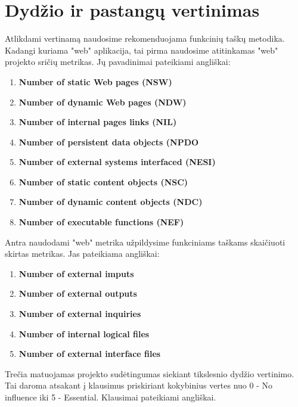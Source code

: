 \documentclass[a4paper,12pt]{article}
\begin{document}
\section{ Dydžio ir pastangų vertinimas}
Atlikdami vertinamą naudosime rekomenduojama funkcinių taškų metodika. Kadangi kuriama "web" aplikacija, tai pirma naudosime atitinkamas "web" projekto sričių metrikas. Jų pavadinimai pateikiami angliškai:
\begin{enumerate}
\item \textbf{Number of static Web pages (NSW)}
\item \textbf{Number of dynamic Web pages (NDW)}
\item \textbf{Number of internal pages links (NIL)}
\item \textbf{Number of persistent data objects (NPDO}
\item \textbf{Number of external systems interfaced (NESI)}
\item \textbf{Number of static content objects (NSC)}
\item \textbf{Number of dynamic content objects (NDC)}
\item \textbf{Number of executable functions
(NEF)}
\end{enumerate}
Antra naudodami "web" metrika užpildysime funkciniams taškams skaičiuoti skirtas metrikas.
Jas pateikiama angliškai:
\begin{enumerate}
\item \textbf{Number of external imputs}
\item \textbf{Number of external outputs}
\item \textbf{Number of external inquiries}
\item \textbf{Number of internal logical files}
\item \textbf{Number of external interface files}
\end{enumerate}
Trečia matuojamas projekto sudėtingumas siekiant tikslesnio dydžio vertinimo. Tai daroma atsakant į klausimus priskiriant kokybinius vertes nuo 0 - No influence iki 5 - Essential. Klausimai pateikiami angliškai.
\end{document}
